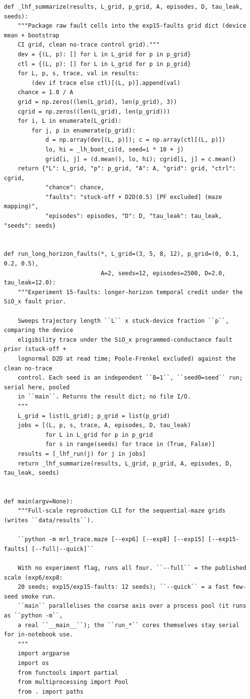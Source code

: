 \begin{lstlisting}[caption={mrl\_trace/maze.py},label={lst:siox-src-maze}]
def _lhf_summarize(results, L_grid, p_grid, A, episodes, D, tau_leak, seeds):
    """Package raw fault cells into the exp15-faults grid dict (device mean + bootstrap
    CI grid, clean no-trace control grid)."""
    dev = {(L, p): [] for L in L_grid for p in p_grid}
    ctl = {(L, p): [] for L in L_grid for p in p_grid}
    for L, p, s, trace, val in results:
        (dev if trace else ctl)[(L, p)].append(val)
    chance = 1.0 / A
    grid = np.zeros((len(L_grid), len(p_grid), 3))
    cgrid = np.zeros((len(L_grid), len(p_grid)))
    for i, L in enumerate(L_grid):
        for j, p in enumerate(p_grid):
            d = np.array(dev[(L, p)]); c = np.array(ctl[(L, p)])
            lo, hi = _lh_boot_ci(d, seed=i * 10 + j)
            grid[i, j] = (d.mean(), lo, hi); cgrid[i, j] = c.mean()
    return {"L": L_grid, "p": p_grid, "A": A, "grid": grid, "ctrl": cgrid,
            "chance": chance,
            "faults": "stuck-off + D2D(0.5) [PF excluded] (maze mapping)",
            "episodes": episodes, "D": D, "tau_leak": tau_leak, "seeds": seeds}


def run_long_horizon_faults(*, L_grid=(3, 5, 8, 12), p_grid=(0, 0.1, 0.2, 0.5),
                            A=2, seeds=12, episodes=2500, D=2.0, tau_leak=12.0):
    """Experiment 15-faults: longer-horizon temporal credit under the SiO_x fault prior.

    Sweeps trajectory length ``L`` x stuck-device fraction ``p``, comparing the device
    eligibility trace under the SiO_x programmed-conductance fault prior (stuck-off +
    lognormal D2D at read time; Poole-Frenkel excluded) against the clean no-trace
    control. Each seed is an independent ``B=1``, ``seed0=seed`` run; serial here, pooled
    in ``main``. Returns the result dict; no file I/O.
    """
    L_grid = list(L_grid); p_grid = list(p_grid)
    jobs = [(L, p, s, trace, A, episodes, D, tau_leak)
            for L in L_grid for p in p_grid
            for s in range(seeds) for trace in (True, False)]
    results = [_lhf_run(j) for j in jobs]
    return _lhf_summarize(results, L_grid, p_grid, A, episodes, D, tau_leak, seeds)


def main(argv=None):
    """Full-scale reproduction CLI for the sequential-maze grids (writes ``data/results``).

    ``python -m mrl_trace.maze [--exp6] [--exp8] [--exp15] [--exp15-faults] [--full|--quick]``

    With no experiment flag, runs all four. ``--full`` = the published scale (exp6/exp8:
    20 seeds; exp15/exp15-faults: 12 seeds); ``--quick`` = a fast few-seed smoke run.
    ``main`` parallelises the coarse axis over a process pool (it runs as ``python -m``,
    a real ``__main__``); the ``run_*`` cores themselves stay serial for in-notebook use.
    """
    import argparse
    import os
    from functools import partial
    from multiprocessing import Pool
    from . import paths


\end{lstlisting}
